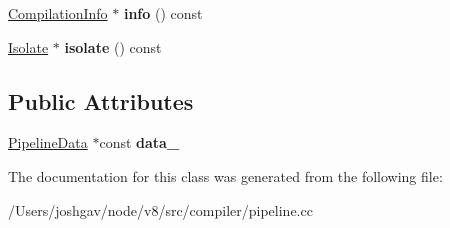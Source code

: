 \begin{DoxyCompactItemize}
\item 
\hyperlink{classv8_1_1internal_1_1_compilation_info}{Compilation\+Info} $\ast$ {\bfseries info} () const \hypertarget{classv8_1_1internal_1_1compiler_1_1_pipeline_impl_a0e0165a07d7ca699f744eace69dd7d01}{}\label{classv8_1_1internal_1_1compiler_1_1_pipeline_impl_a0e0165a07d7ca699f744eace69dd7d01}

\item 
\hyperlink{classv8_1_1internal_1_1_isolate}{Isolate} $\ast$ {\bfseries isolate} () const \hypertarget{classv8_1_1internal_1_1compiler_1_1_pipeline_impl_a942b7f227421654fc00ddce5a6d65cbf}{}\label{classv8_1_1internal_1_1compiler_1_1_pipeline_impl_a942b7f227421654fc00ddce5a6d65cbf}

\end{DoxyCompactItemize}
\subsection*{Public Attributes}
\begin{DoxyCompactItemize}
\item 
\hyperlink{classv8_1_1internal_1_1compiler_1_1_pipeline_data}{Pipeline\+Data} $\ast$const {\bfseries data\+\_\+}\hypertarget{classv8_1_1internal_1_1compiler_1_1_pipeline_impl_ac68f81061a8b4c84843f2da7b78e4427}{}\label{classv8_1_1internal_1_1compiler_1_1_pipeline_impl_ac68f81061a8b4c84843f2da7b78e4427}

\end{DoxyCompactItemize}


The documentation for this class was generated from the following file\+:\begin{DoxyCompactItemize}
\item 
/\+Users/joshgav/node/v8/src/compiler/pipeline.\+cc\end{DoxyCompactItemize}
